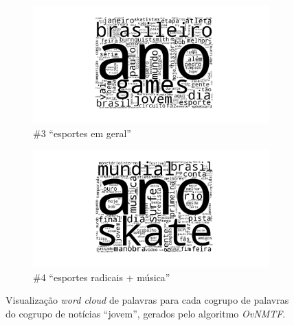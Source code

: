 \documentclass[
    12pt,                %
    oneside,            %
    a4paper,            %
    english,            %
    brazil                %
    ]{abntex2ppgsi}
\begin{document}
\begin{figure}[H]
\centering
    \begin{subfigure}[b]{0.45\textwidth}
        \includegraphics[width=\textwidth]{img/ovnmtf-nc-2-tc-1.png}
        \caption{\#3 ``esportes em geral''}
    \end{subfigure}
    \begin{subfigure}[b]{0.45\textwidth}
        \includegraphics[width=\textwidth]{img/ovnmtf-nc-2-tc-2.png}
        \caption{\#4 ``esportes radicais + música''}
    \end{subfigure}

    \caption{Visualização \textit{word cloud} de palavras para cada cogrupo de palavras do cogrupo de notícias ``jovem'', gerados pelo algoritmo \textit{OvNMTF}.}
    \label{fig:ovnmtf:wordcloud-2}
\end{figure}
\end{document}

